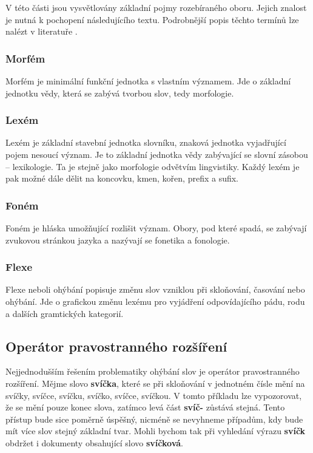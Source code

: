 \documentclass[FM,DP]{tulthesis}
\begin{document}
V této části jsou vysvětlovány základní pojmy rozebíraného oboru. Jejich znalost je nutná k pochopení 
následujícího textu. Podrobnější popis těchto termínů lze nalézt v literatuře \cite{strossa}.

\subsubsection*{Morfém}

Morfém je minimální funkční jednotka s vlastním významem. Jde o základní jednotku vědy, 
která se zabývá tvorbou slov, tedy morfologie.

\subsubsection*{Lexém}

Lexém je základní stavební jednotka slovníku, znaková jednotka vyjadřující pojem nesoucí
význam. Je to základní jednotka vědy zabývající se slovní zásobou -- lexikologie. Ta je stejně 
jako morfologie odvětvím lingvistiky. Každý lexém je pak možné dále dělit na koncovku, 
kmen, kořen, prefix a sufix.

\subsubsection*{Foném}

Foném je hláska umožňující rozlišit význam. Obory, pod které spadá, se zabývají zvukovou
stránkou jazyka a nazývají se fonetika a fonologie.

\subsubsection*{Flexe}

Flexe neboli ohýbání popisuje změnu slov vzniklou při skloňování, časování nebo ohýbání.
Jde o grafickou změnu lexému pro vyjádření odpovídajícího pádu, rodu a dalších gramtických
kategorií.

\subsection{Operátor pravostranného rozšíření}

Nejjednodušším řešením problematiky ohýbání slov je operátor pravostranného rozšíření.
Mějme slovo \textbf{svíčka}, které se při skloňování v jednotném čísle mění na svíčky, svíčce, 
svíčku, svíčko, svíčce, svíčkou. V tomto příkladu lze vypozorovat, že se mění
pouze konec slova, zatímco levá část \textbf{svíč-} zůstává stejná. Tento přístup bude 
sice poměrně úspěšný, nicméně se nevyhneme případům, kdy bude mít více slov stejný
základní tvar. Mohli bychom tak při vyhledání výrazu \textbf{svíčk} obdržet i dokumenty
obsahující slovo \textbf{svíčková}.
\end{document}
